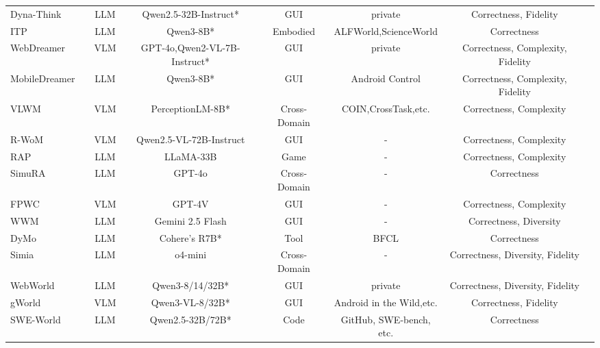 \documentclass{llmxive}
\providecommand{\Text}{
  \begin{tikzpicture}[baseline=(char.base)]
    \fill[textgreen!50] (0,0) circle (0.18);
    \node[white, font=\scriptsize\rmfamily, inner sep=0pt] (char) at (0,0) {T};
  \end{tikzpicture}
}
\begin{document}
\begin{table}
{\begin{tabular}{lccccccc}
 Dyna-Think \cite{Dyna-Think} &\Text & LLM & Qwen2.5-32B-Instruct* &  GUI & private & Correctness, Fidelity \\
 ITP \cite{ITP} &\Text & LLM & Qwen3-8B* &  Embodied & ALFWorld,ScienceWorld & Correctness \\
 WebDreamer \cite{WebDreamer} &\Text & VLM & GPT-4o,Qwen2-VL-7B-Instruct* &  GUI & private & Correctness, Complexity, Fidelity \\
 MobileDreamer \cite{MobileDreamer} &\Text & LLM & Qwen3-8B* &  GUI & Android Control & Correctness, Complexity, Fidelity \\
 VLWM \cite{VLWM} &\Text & VLM & PerceptionLM-8B* &  Cross-Domain & COIN,CrossTask,etc.  & Correctness, Complexity \\
 R-WoM \cite{R-WoM} &\Text & VLM & Qwen2.5-VL-72B-Instruct &  GUI & -  &  Correctness, Complexity \\
 RAP \cite{RAP} &\Text & LLM & LLaMA-33B &  Game & -  & Correctness, Complexity \\
 SimuRA \cite{SimuRA} &\Text & LLM & GPT-4o &  Cross-Domain & -  & Correctness \\
 FPWC \cite{FPWC} &\Text & VLM & GPT-4V &  GUI & -  & Correctness, Complexity \\
 WWM \cite{WWM} &\Text & LLM & Gemini 2.5 Flash &  GUI & -  & Correctness, Diversity \\
 DyMo \cite{DyMo} &\Text & LLM & Cohere's R7B* &  Tool & BFCL  & Correctness \\
 Simia \cite{Simia} &\Text & LLM & o4-mini & Cross-Domain & - & Correctness, Diversity, Fidelity \\
 WebWorld \cite{WebWorld} &\Text & LLM & Qwen3-8/14/32B* & GUI & private & Correctness, Diversity, Fidelity \\
 gWorld \cite{gWorld} &\Text & VLM & Qwen3-VL-8/32B* & GUI & Android in the Wild,etc. & Correctness, Fidelity \\
 SWE-World \cite{SWE-World} & \Text & LLM & Qwen2.5-32B/72B* & Code & GitHub, SWE-bench, etc. & Correctness \\


\end{tabular}}
\end{table}
\end{document}

